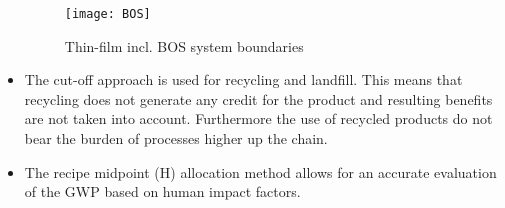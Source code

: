 \begin{itemize}
\begin{figure}[H]
\begin{center}
\texttt{[image: BOS]}
\caption{Thin-film incl. BOS system boundaries}
\label{fig:BOS}
\end{center}
\end{figure}

	\item The cut-off approach is used for recycling and landfill. This means that recycling does not generate any credit for the product and resulting benefits are not taken into account. Furthermore the use of recycled products do not bear the burden of processes higher up the chain.
	\item The recipe midpoint (H) allocation method allows for an accurate evaluation of the GWP based on human impact factors.
\end{itemize}



